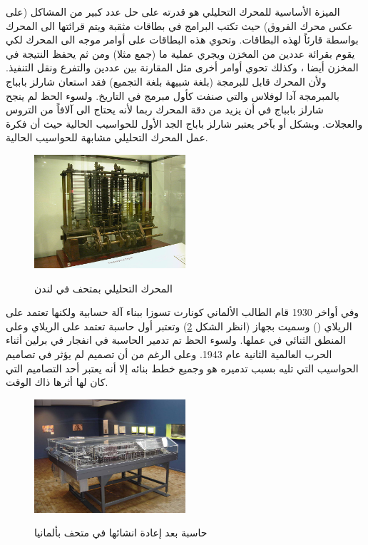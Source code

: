 \documentclass[document.tex]{subfiles}
\begin{document}
الميزة الأساسية للمحرك التحليلي هو قدرته على حل عدد كبير من المشاكل (على عكس محرك الفروق) حيث تكتب البرامج في بطاقات مثقبة ويتم قرائتها الى المحرك بواسطة قارئاً لهذه البطاقات. وتحوي هذه البطاقات على أوامر موجه الى المحرك لكي يقوم بقرائة عددين من المخزن ويجري عملية ما (جمع مثلا) ومن ثم يحفظ النتيجة في المخزن أيضا ، وكذلك تحوي أوامر أخرى مثل المقارنة بين عددين والتفرع ونقل التنفيذ. ولأن المحرك قابل للبرمجة (بلغة شبيهة بلغة التجميع) فقد استعان شارلز بابباج بالمبرمجة آدا لوفلاس  والتي صنفت كأول مبرمج في التاريخ. ولسوء الحظ لم ينجح شارلز بابباج في أن يزيد من دقة المحرك ربما لأنه يحتاج الى آلافاً من التروس والعجلات. وبشكل أو بآخر يعتبر شارلز باباج الجد الأول للحواسيب الحالية حيث أن فكرة عمل المحرك التحليلي مشابهة للحواسيب الحالية.

\begin{figure}[h!] 
  \caption{المحرك التحليلي بمتحف في لندن}
  \centering
   \includegraphics[width=0.5\textwidth]{../img/AnalyticalMachine}
 \label{fig:AnalyticalMachine} 
\end{figure}
وفي أواخر 1930 قام الطالب الألماني كونارت تسوزا  ببناء آلة حسابية ولكنها تعتمد على الريلاي () وسميت بجهاز  (انظر الشكل \ref{fig:Z1}) وتعتبر أول حاسبة تعتمد على الريلاي وعلى المنطق الثنائي في عملها. ولسوء الحظ تم تدمير الحاسبة  في انفجار في برلين أثناء الحرب العالمية الثانية عام 1943. وعلى الرغم من أن تصميم  لم يؤثر في تصاميم الحواسيب التي تليه بسبب تدميره هو وجميع خطط بنائه إلا أنه يعتبر أحد التصاميم التي كان لها أثرها ذاك الوقت.
\begin{figure}[h!] 
  \caption{حاسبة  بعد إعادة انشائها في متحف بألمانيا}
  \centering
   \includegraphics[width=0.5\textwidth]{../img/Z1}
 \label{fig:Z1} 
\end{figure}
\end{document}
